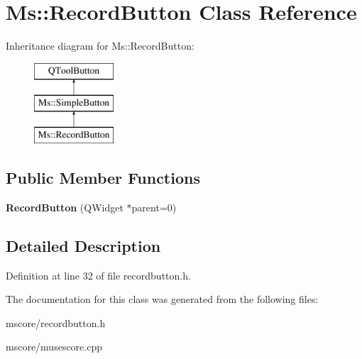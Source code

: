 \hypertarget{class_ms_1_1_record_button}{}\section{Ms\+:\+:Record\+Button Class Reference}
\label{class_ms_1_1_record_button}
Inheritance diagram for Ms\+:\+:Record\+Button\+:\begin{figure}[H]
\begin{center}
\leavevmode
\includegraphics[height=3.000000cm]{class_ms_1_1_record_button}
\end{center}
\end{figure}
\subsection*{Public Member Functions}
\begin{DoxyCompactItemize}
\item 
\mbox{\label{class_ms_1_1_record_button_a4ed1f63a3f429aab9d26a1d88991acea}} 
{\bfseries Record\+Button} (Q\+Widget $\ast$parent=0)
\end{DoxyCompactItemize}


\subsection{Detailed Description}


Definition at line 32 of file recordbutton.\+h.



The documentation for this class was generated from the following files\+:\begin{DoxyCompactItemize}
\item 
mscore/recordbutton.\+h\item 
mscore/musescore.\+cpp\end{DoxyCompactItemize}
